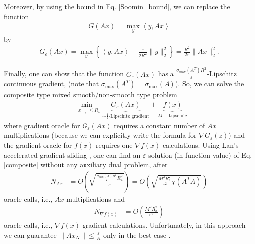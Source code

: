 \documentclass[final]{siamart1116}
\numberwithin{theorem}{section}
\begin{document}
	Moreover, by using the bound in Eq. \eqref{Soomin_bound}, we can replace the function
	\begin{align*}
	G(Ax) = \max_y \left\langle y,Ax\right\rangle
	\end{align*}
	by
	\begin{align*}
	G_\varepsilon(Ax) = \max_y \left\lbrace \left\langle y,Ax \right\rangle  - \frac{\varepsilon}{2R^2} \|y\|_2^2\right\rbrace = \frac{R^2}{2\varepsilon} \|Ax\|_2^2.
	\end{align*}
	
	Finally, one can show that the function $G_\varepsilon(Ax)$ has a $\frac{\sigma_{\max}(A^T)R^2}{\varepsilon}$-Lipschitz continuous gradient, (note that $\sigma_{\max}(A^T) = \sigma_{\max}(A)$). So, we can solve the composite type mixed smooth/non-smooth type problem
	\begin{align}\label{composite}
	\min_{\|x\|_2 \leq R_x } \underbrace{G_\varepsilon(Ax)}_{\sim \frac{1}{\varepsilon}\text{-Lipschitz gradient}} + \underbrace{f(x)}_{M-\text{Lipschitz}}
	\end{align}
	where gradient oracle for $G_\varepsilon(Ax)$ requires a constant number of $Ax$ multiplications (because we can explicitly write the formula for $\nabla G_\varepsilon (z)$) and the gradient oracle for $f(x)$ requires one $\nabla f(x)$ calculations. Using Lan's accelerated gradient sliding \cite{lan16}, one can find an $\varepsilon$-solution (in function value) of Eq. \eqref{composite} without any auxiliary dual problem, after
	\begin{align*}
	N_{Ax} &= O\left(  \sqrt{\frac{\frac{\sigma_{\max}(A)R^2}{\varepsilon}R_x^2}{\varepsilon}} \right)
	= O\left( \sqrt{\frac{M^2R_x^2}{\varepsilon^2} \chi(A^TA)}\right) 
	\end{align*}
	oracle calls, i.e., $Ax$ multiplications and
	\begin{align*}
	N_{\nabla f(x)} &= O\left(  \frac{M^2 R_x^2}{\varepsilon^2}\right) 
	\end{align*}
	oracle calls, i.e., $\nabla f(x)$-gradient calculations. Unfortunately, in this approach we can guarantee $\|Ax_N\|\leq \frac{\varepsilon}{R}$ only in the best case \cite{ani15}.
	
\end{document}
